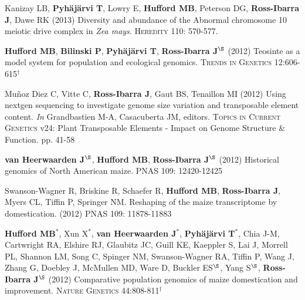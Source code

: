 \documentclass[letterpaper]{article}
\begin{document}
\begin{etaremune}
\vspace{-2ex}
\item Kanizay LB, {\bf Pyh\"aj\"arvi T}, Lowry E, {\bf Hufford MB}, Peterson DG, {\bf Ross-Ibarra J}, Dawe RK (2013) Diversity and abundance of the Abnormal chromosome 10 meiotic drive complex in \emph{Zea mays}. \textsc{Heredity} 110: 570-577.

\vspace{-2ex}
\item {\bf Hufford MB}, {\bf Bilinski P}, {\bf Pyh\"aj\"arvi T}, {\bf Ross-Ibarra J}$^\S$ (2012) Teosinte as a model system for population and ecological genomics. \textsc{Trends in Genetics} 12:606-615$^\dagger$

\vspace{-2ex}
\item Mu\~{n}oz Diez C, Vitte C, {\bf Ross-Ibarra J}, Gaut BS, Tenaillon MI (2012) Using nextgen sequencing to investigate genome size variation and transposable element content. \emph{In} Grandbastien M-A, Casacuberta JM, editors. \textsc{Topics in Current Genetics} v24: Plant Transposable Elements - Impact on Genome Structure \& Function. pp. 41-58 

\vspace{-2ex}
\item  {\bf van Heerwaarden J}$^\S$, {\bf Hufford MB}, {\bf Ross-Ibarra J}$^\S$ (2012) Historical genomics of North American maize. \textsc{PNAS} 109: 12420-12425

\vspace{-2ex}
\item Swanson-Wagner R, Briskine R, Schaefer R, {\bf Hufford MB}, {\bf Ross-Ibarra J}, Myers CL, Tiffin P, Springer NM.  Reshaping of the maize transcriptome by domestication. (2012) \textsc{PNAS}  109: 11878-11883

\vspace{-2ex}
\item {\bf Hufford MB}$^*$, Xun X$^*$, {\bf van Heerwaarden J}$^*$, {\bf Pyh\"aj\"arvi T}$^*$, Chia J-M, Cartwright RA, Elshire RJ, Glaubitz JC, Guill KE, Kaeppler S, Lai J, Morrell PL, Shannon LM, Song C, Spinger NM, Swanson-Wagner RA, Tiffin P, Wang J, Zhang G, Doebley J, McMullen MD, Ware D, Buckler ES$^\S$, Yang S$^\S$, {\bf Ross-Ibarra J}$^\S$ (2012) Comparative population genomics of maize domestication and improvement. \textsc{Nature Genetics} 44:808-811$^\dagger$


\end{etaremune}
\end{document}
